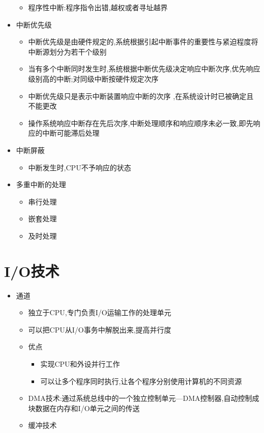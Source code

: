 \documentclass[a4paper,12pt,notitlepage]{article}
\begin{document}
\begin{itemize}
\begin{itemize}
		\item 程序性中断:程序指令出错,越权或者寻址越界
	\end{itemize}
	\item 中断优先级
	\begin{itemize}
		\item 中断优先级是由硬件规定的,系统根据引起中断事件的重要性与紧迫程度将中断源划分为若干个级别
		\item 当有多个中断同时发生时,系统根据中断优先级决定响应中断次序,优先响应级别高的中断;对同级中断按硬件规定次序
		\item 中断优先级只是表示中断装置响应中断的次序 ,在系统设计时已被确定且不能更改
		\item 操作系统响应中断存在先后次序,中断处理顺序和响应顺序未必一致,即先响应的中断可能滞后处理
	\end{itemize}
	\item 中断屏蔽
	\begin{itemize}
		\item 中断发生时,CPU不予响应的状态
	\end{itemize}
	\item 多重中断的处理
	\begin{itemize}
		\item 串行处理
		\item 嵌套处理
		\item 及时处理
	\end{itemize}
\end{itemize}

\section{I/O技术}
\begin{itemize}
	\item 通道
	\begin{itemize}
		\item 独立于CPU,专门负责I/O运输工作的处理单元
		\item 可以把CPU从I/O事务中解脱出来,提高并行度
		\item 优点
		\begin{itemize}
			\item 实现CPU和外设并行工作
			\item 可以让多个程序同时执行,让各个程序分别使用计算机的不同资源
		\end{itemize}
		\item DMA技术:通过系统总线中的一个独立控制单元—DMA控制器,自动控制成块数据在内存和I/O单元之间的传送
		\item 缓冲技术
	\end{itemize}
\end{itemize}
\end{document}

